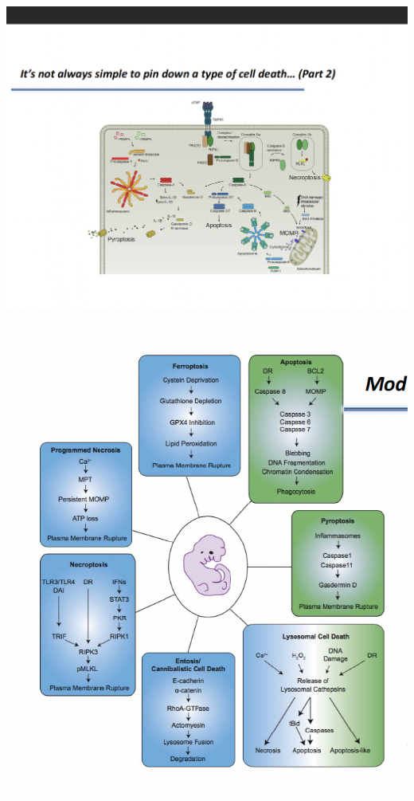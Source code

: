 \begin{itemize}
\begin{itemize}
\includegraphics[width=1\textwidth]{Images/CellDeath.png}\\[1cm]

\includegraphics[width=1\textwidth]{Images/Types.png}\\[1cm]



\end{itemize}
\end{itemize}
